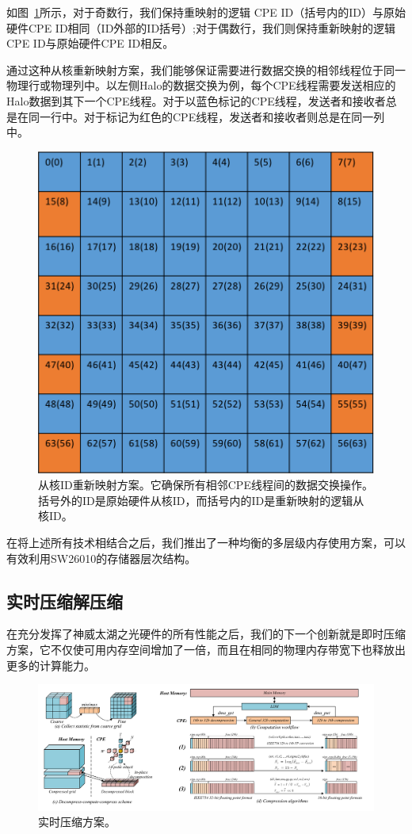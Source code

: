 \documentclass[degree=doctor]{thuthesis}
\begin{document}
如图~\ref{fig:id-remapping}所示，对于奇数行，我们保持重映射的逻辑 CPE ID（括号内的ID）与原始硬件CPE ID相同（ID外部的ID括号）;对于偶数行，我们则保持重新映射的逻辑CPE ID与原始硬件CPE ID相反。

通过这种从核重新映射方案，我们能够保证需要进行数据交换的相邻线程位于同一物理行或物理列中。以左侧Halo的数据交换为例，每个CPE线程需要发送相应的Halo数据到其下一个CPE线程。对于以蓝色标记的CPE线程，发送者和接收者总是在同一行中。对于标记为红色的CPE线程，发送者和接收者则总是在同一列中。

\begin{figure}[h]
\centering
\includegraphics[width=0.5\columnwidth]{awp_register_remap.png}
\caption{
从核ID重新映射方案。它确保所有相邻CPE线程间的数据交换操作。 括号外的ID是原始硬件从核ID，而括号内的ID是重新映射的逻辑从核ID。}
\label{fig:id-remapping}
\end{figure}

在将上述所有技术相结合之后，我们推出了一种均衡的多层级内存使用方案，可以有效利用SW26010的存储器层次结构。

\subsection{实时压缩解压缩}

在充分发挥了神威太湖之光硬件的所有性能之后，我们的下一个创新就是即时压缩方案，它不仅使可用内存空间增加了一倍，而且在相同的物理内存带宽下也释放出更多的计算能力。

\begin{figure}[h]
\centering

\includegraphics[width=1.0\textwidth]{compression.pdf}
\caption{实时压缩方案。}
\label{fig:compression}
\end{figure}
\end{document}
